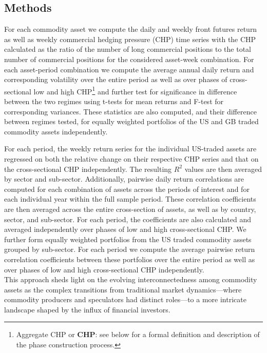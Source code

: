 \documentclass[
  authoryear,
  preprint,
  3p]{elsarticle}
\begin{document}
\subsection{Methods}\label{sec-methods}

For each commodity asset we compute the daily and weekly front futures
return as well as weekly commercial hedging pressure (CHP) time series
with the CHP calculated as the ratio of the number of long commercial
positions to the total number of commercial positions for the considered
asset-week combination. For each asset-period combination we compute the
average annual daily return and corresponding volatility over the entire
period as well as over phases of cross-sectional low and high
CHP\footnote{Aggregate CHP or \textbf{CHP}: see below for a formal
  definition and description of the phase construction process.} and
further test for significance in difference between the two regimes
using t-tests for mean returns and F-test for corresponding variances.
These statistics are also computed, and their difference between regimes
tested, for equally weighted portfolios of the US and GB traded
commodity assets independently.

For each period, the weekly return series for the individual US-traded
assets are regressed on both the relative change on their respective CHP
series and that on the cross-sectional CHP independently. The resulting
\(R^{2}\) values are then averaged by sector and sub-sector.
Additionally, pairwise daily return correlations are computed for each
combination of assets across the periods of interest and for each
individual year within the full sample period. These correlation
coefficients are then averaged across the entire cross-section of
assets, as well as by country, sector, and sub-sector. For each period,
the coefficients are also calculated and averaged independently over
phases of low and high cross-sectional CHP. We further form equally
weighted portfolios from the US traded commodity assets grouped by
sub-sector. For each period we compute the average pairwise return
correlation coefficients between these portfolios over the entire period
as well as over phases of low and high cross-sectional CHP
independently.\\
This approach sheds light on the evolving interconnectedness among
commodity assets as the complex transitions from traditional market
dynamics---where commodity producers and speculators had distinct
roles---to a more intricate landscape shaped by the influx of financial
investors.
\end{document}

